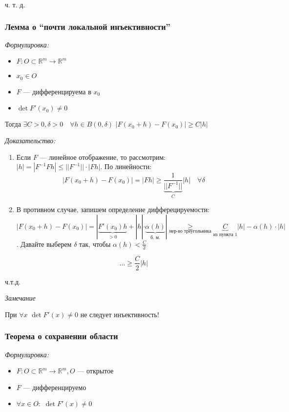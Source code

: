 \documentclass{article}
\def\dbl{\,\,}
\begin{document}
ч. т. д.

\subsubsection{Лемма о ``почти локальной инъективности''}
\textit{Формулировка:}

\begin{itemize}
    \item $F: O \subset \mathbb{R}^m \rightarrow \mathbb{R}^m$
    \item $x_0 \in O$
    \item $F$ --- дифференцируема в $x_0$
    \item $\det F'(x_0) \neq 0 $
\end{itemize}

Тогда $\exists C > 0, \delta > 0 \quad \forall h \in B(0, \delta) \dbl |F(x_0 + h) - F(x_0)| \ge C|h|$

\textit{Доказательство:}

\begin{enumerate}
    \item Если $F$ --- линейное отображение, то рассмотрим: $|h| = |F^{-1}Fh| \le ||F^{-1}|| \cdot |Fh|$. По линейности: 
    \[|F(x_0 + h) - F(x_0)| = |Fh| \ge \underbrace{\frac{1}{||F^{-1}||}}_{C}|h| \quad \forall \delta\]
    \item В противном случае, запишем определение дифферецируемости: $|F(x_0 + h) - F(x_0)| = |\underbrace{F'(x_0)h}_{> 0} + |h| \cdot \underbrace{\alpha(h)}_{\text{б. м.}}| \underset{\text{нер-во треугольника}}{\ge} \underbrace{C}_{\text{из пункта 1}}|h| - \alpha(h) \cdot |h|$. Давайте выберем $\delta$ так, чтобы $\alpha(h) < \frac{C}{2}$
    
    \[\ldots\ge \frac{C}{2}|h|\]
\end{enumerate}

ч.т.д.

\textit{Замечание}

При $\forall x \dbl \det F'(x) \neq 0$ не следует инъективность!

\subsubsection{Теорема о сохранении области}

\textit{Формулировка:}
\begin{itemize}
    \item $F: O \subset \mathbb{R}^m \rightarrow \mathbb{R}^m, O$ --- открытое
    \item $F$ --- дифференцируемо
    \item $\forall x \in O: \dbl \det F'(x) \neq 0$
\end{itemize}
\end{document}
